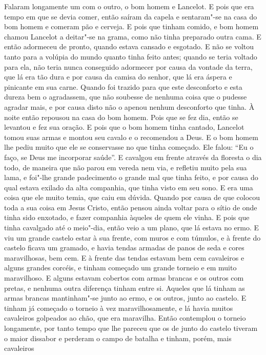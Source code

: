 Falaram longamente um com o outro, o bom homem e Lancelot. E pois que era tempo
em que se devia comer, então saíram da capela e sentaram"-se na casa do bom
homem e comeram pão e cerveja. E pois que tinham comido, e bom homem
chamou Lancelot a deitar"-se na grama, como não tinha preparado outra cama. E
então adormeceu de pronto, quando estava cansado e esgotado. E não se voltou
tanto para a volúpia do mundo quanto tinha feito antes; quando se teria voltado
para ela, não teria nunca conseguido adormecer por causa da vontade da terra,
que lá era tão dura e por causa da camisa do senhor, que lá era áspera e
pinicante em sua carne. Quando foi trazido para que este desconforto e esta
dureza bem o agradassem, que não soubesse de nenhuma coisa que o pudesse
agradar mais, e por causa disto não o apenou nenhum desconforto que tinha. À 
noite então repousou na casa do bom homem. Pois que se fez dia, então se
levantou e fez sua oração. E pois que o bom homem tinha cantado, Lancelot
tomou suas armas e montou seu cavalo e o recomendou a Deus. E o bom homem lhe
pediu muito que ele se conservasse no que tinha começado. Ele falou: “Eu o
faço, se Deus me incorporar saúde”. E cavalgou em frente através da floresta o
dia todo, de maneira que não parou em vereda nem via, e refletiu muito pela sua
lama, e foi"-lhe grande padecimento o grande mal que tinha feito, e por causa do
qual estava exilado da alta companhia, que tinha visto em seu sono. E era uma
coisa que ele muito temia, que caiu em dúvida. Quando por causa de que colocou
toda a sua coisa em Jesus Cristo, então pensou ainda voltar para o sítio de
onde tinha sido enxotado, e fazer companhia àqueles de quem ele vinha. E pois
que tinha cavalgado até o meio"-dia, então veio a um plano, que lá estava no
ermo. E viu um grande castelo estar à sua frente, com muros e com túmulos, e à
frente do castelo ficava um gramado, e havia tendas armadas de panos de seda e
cores maravilhosas, bem cem. E à frente das tendas estavam bem cem cavaleiros e
alguns grandes corcéis, e tinham começado um grande torneio e em muito
maravilhoso. E alguns estavam cobertos com armas brancas e os outros com
pretas, e nenhuma outra diferença tinham entre si. Aqueles que lá tinham as
armas brancas mantinham"-se junto ao ermo, e os outros, junto ao castelo. E
tinham já começado o torneio à vez maravilhosamente, e lá havia muitos
cavaleiros golpeados ao chão, que era maravilha. Então contemplou o torneio
longamente, por tanto tempo que lhe pareceu que os de junto do castelo tiveram
o maior dissabor e perderam o campo de batalha e tinham, porém, mais cavaleiros

